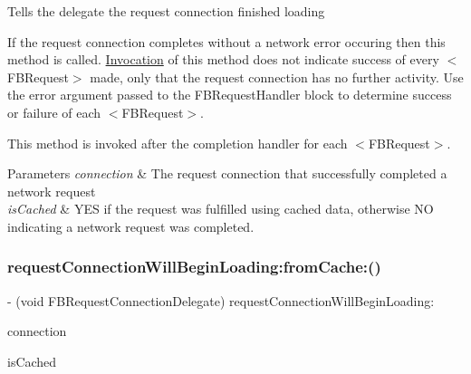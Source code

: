 Tells the delegate the request connection finished loading

If the request connection completes without a network error occuring then this method is called. \hyperlink{classInvocation}{Invocation} of this method does not indicate success of every $<$\+F\+B\+Request$>$ made, only that the request connection has no further activity. Use the error argument passed to the F\+B\+Request\+Handler block to determine success or failure of each $<$\+F\+B\+Request$>$.

This method is invoked after the completion handler for each $<$\+F\+B\+Request$>$.


\begin{DoxyParams}{Parameters}
{\em connection} & The request connection that successfully completed a network request \\
\hline
{\em is\+Cached} & Y\+ES if the request was fulfilled using cached data, otherwise NO indicating a network request was completed. \\
\hline
\end{DoxyParams}
\mbox{\label{protocolFBRequestConnectionDelegate_01-p_a8e31e2b5023edb3b869c0cd0be288a29}} 
\subsubsection{\texorpdfstring{request\+Connection\+Will\+Begin\+Loading\+:from\+Cache\+:()}{requestConnectionWillBeginLoading:fromCache:()}\hspace{0.1cm}{\footnotesize\ttfamily [1/5]}}
{\footnotesize\ttfamily -\/ (void F\+B\+Request\+Connection\+Delegate) request\+Connection\+Will\+Begin\+Loading\+: \begin{DoxyParamCaption}\item[{(\hyperlink{interfaceFBRequestConnection}{F\+B\+Request\+Connection} $\ast$)}]{connection }\item[{fromCache:(B\+O\+OL)}]{is\+Cached }\end{DoxyParamCaption}\hspace{0.3cm}{\ttfamily [optional]}}

